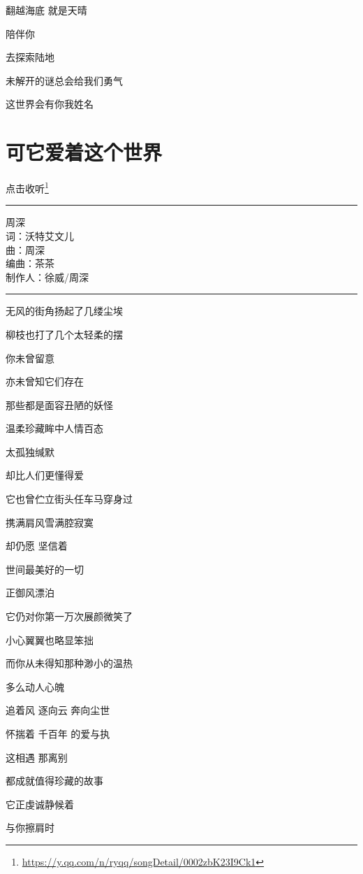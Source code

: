 \documentclass[]{ctexbook}
\renewcommand{\href}[2]{#2\footnote{\url{#1}}}
\begin{document}
翻越海底 就是天晴

陪伴你

去探索陆地

未解开的谜总会给我们勇气

这世界会有你我姓名

\section*{可它爱着这个世界}\label{love-the-world}


\href{https://y.qq.com/n/ryqq/songDetail/0002zbK23I9Ck1}{点击收听}

\begin{center}\rule{0.5\linewidth}{0.5pt}\end{center}

周深\\
词：沃特艾文儿\\
曲：周深\\
编曲：茶茶\\
制作人：徐威/周深

\begin{center}\rule{0.5\linewidth}{0.5pt}\end{center}

无风的街角扬起了几缕尘埃

柳枝也打了几个太轻柔的摆

你未曾留意

亦未曾知它们存在

那些都是面容丑陋的妖怪

温柔珍藏眸中人情百态

太孤独缄默

却比人们更懂得爱

它也曾伫立街头任车马穿身过

携满肩风雪满腔寂寞

却仍愿 坚信着

世间最美好的一切

正御风漂泊

它仍对你第一万次展颜微笑了

小心翼翼也略显笨拙

而你从未得知那种渺小的温热

多么动人心魄

追着风 逐向云 奔向尘世

怀揣着 千百年 的爱与执

这相遇 那离别

都成就值得珍藏的故事

它正虔诚静候着

与你擦肩时
\end{document}
